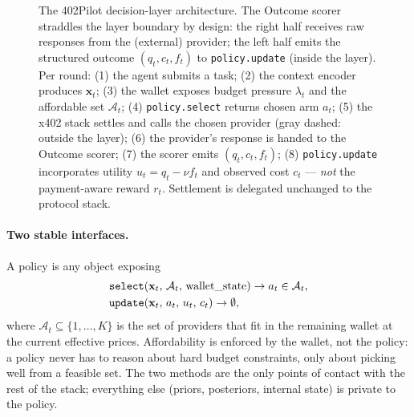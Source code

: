 \begin{figure}[t]
{%
}
\caption{The 402Pilot decision-layer architecture. The Outcome scorer straddles the layer boundary by design: the right half receives raw responses from the (external) provider; the left half emits the structured outcome $(q_t,c_t,f_t)$ to \texttt{policy.update} (inside the layer). Per round: (1) the agent submits a task; (2) the context encoder produces $\mathbf{x}_t$; (3) the wallet exposes budget pressure $\lambda_t$ and the affordable set $\mathcal{A}_t$; (4) \texttt{policy.select} returns chosen arm $a_t$; (5) the x402 stack settles and calls the chosen provider (gray dashed: outside the layer); (6) the provider's response is handed to the Outcome scorer; (7) the scorer emits $(q_t,c_t,f_t)$; (8) \texttt{policy.update} incorporates utility $u_t = q_t - \nu f_t$ and observed cost $c_t$ --- \emph{not} the payment-aware reward $r_t$. Settlement is delegated unchanged to the protocol stack.}
\label{fig:architecture}
\end{figure}

\paragraph{Two stable interfaces.}
A policy is any object exposing
\begin{align*}
&\mathtt{select}(\mathbf{x}_t,\, \mathcal{A}_t,\, \mathrm{wallet\_state}) \to a_t \in \mathcal{A}_t, \\
&\mathtt{update}(\mathbf{x}_t,\, a_t,\, u_t,\, c_t) \to \emptyset,
\end{align*}
where $\mathcal{A}_t \subseteq \{1, \ldots, K\}$ is the set of providers that fit in the remaining wallet at the current effective prices. Affordability is enforced by the wallet, not the policy: a policy never has to reason about hard budget constraints, only about picking well from a feasible set. The two methods are the only points of contact with the rest of the stack; everything else (priors, posteriors, internal state) is private to the policy.

